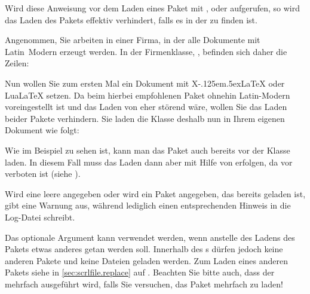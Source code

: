\begin{Declaration}
\end{Declaration}
Wird diese Anweisung vor dem
Laden eines Paket mit ,
 oder
aufgerufen, so wird das Laden des Pakets effektiv verhindert, falls es in
der  zu finden ist.
%
\begin{Example}
  Angenommen, Sie arbeiten in einer Firma, in der alle Dokumente mit
  Latin~Modern erzeugt werden. In der Firmenklasse, , befinden
  sich daher die Zeilen:
\begin{lstcode}
  \RequirePackage[T1]{fontenc}
  \RequirePackage{lmodern}
\end{lstcode}
  Nun wollen Sie zum ersten Mal ein Dokument mit
  X\kern-.125em\lower.5ex\hbox{}\LaTeX{} oder Lua\LaTeX{}
  setzen. Da beim hierbei empfohlenen Paket  ohnehin
  Latin-Modern voreingestellt ist und das Laden von  eher
  störend wäre, wollen Sie das Laden beider Pakete verhindern. Sie laden die
  Klasse deshalb nun in Ihrem eigenen Dokument wie folgt:
\end{Example}
Wie im Beispiel zu sehen ist, kann man das Paket  auch
bereits vor der Klasse laden. In diesem Fall muss das Laden dann aber mit
Hilfe von  erfolgen, da
 vor  verboten ist (siehe
\cite{latex:clsguide}).

Wird eine leere  angegeben oder wird ein Paket angegeben,
das bereits geladen ist, gibt  eine
Warnung aus, während
lediglich einen entsprechenden Hinweis in die Log-Datei schreibt.

Das optionale Argument kann verwendet
werden, wenn anstelle des Ladens des Pakets etwas anderes getan werden
soll. Innerhalb des s dürfen jedoch keine anderen
Pakete und keine Dateien geladen werden. Zum Laden eines anderen Pakets siehe
 in \autoref{sec:scrlfile.replace} auf
. Beachten Sie
bitte auch, dass der  mehrfach ausgeführt wird, falls
Sie versuchen, das Paket mehrfach zu laden!%
\EndIndexGroup



